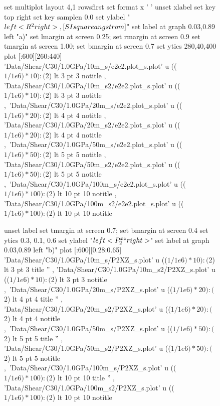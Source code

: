 \documentclass[aps,prb,reprint,superscriptaddress, a4paper]{revtex4-1}
\begin{document}
\begin{figure}
    	\begin{center}
		\begin{gnuplot}[terminal=pdf, terminaloptions={size \SERFigwidth cm, \SERFigheight cm color solid}]
			set multiplot layout 4,1 rowsfirst
			set format x ' '
			unset xlabel
			set key top right
			set key samplen  0.0
			set ylabel "$\\left< R^2\\right>  \\,[\\SI{}{\\square\\angstrom}]$"          
			set label at graph 0.03,0.89 left "a)"
			set lmargin at screen 0.25; set rmargin at screen 0.9
			set tmargin at screen 1.00; set bmargin at screen 0.7
			set ytics 280,40,400 
			plot [:600][260:440] 	'Data/Shear/C30/1.0GPa/10m_s/e2e2.plot_s.plot'  u  (($1/1e6)*10):($2) lt 3 pt 3 notitle  , 'Data/Shear/C30/1.0GPa/10m_s2/e2e2.plot_s.plot'  u (($1/1e6)*10):($2)  lt 3 pt 3 notitle ,\
								'Data/Shear/C30/1.0GPa/20m_s/e2e2.plot_s.plot'  u  (($1/1e6)*20):($2) lt 4 pt 4 notitle  , 'Data/Shear/C30/1.0GPa/20m_s2/e2e2.plot_s.plot'  u (($1/1e6)*20):($2)  lt 4 pt 4 notitle ,\
								'Data/Shear/C30/1.0GPa/50m_s/e2e2.plot_s.plot'   u (($1/1e6)*50):($2) lt 5 pt 5 notitle  , 'Data/Shear/C30/1.0GPa/50m_s2/e2e2.plot_s.plot' u  (($1/1e6)*50):($2)  lt 5 pt 5 notitle ,\
								'Data/Shear/C30/1.0GPa/100m_s/e2e2.plot_s.plot' u  (($1/1e6)*100):($2) lt 10 pt 10 notitle  , 'Data/Shear/C30/1.0GPa/100m_s2/e2e2.plot_s.plot' u (($1/1e6)*100):($2) lt 10 pt 10  notitle 
			
			unset label
			set tmargin at screen 0.7; set bmargin at screen 0.4
			set ytics 0.3, 0.1, 0.6			
			set ylabel "$\\left<P_{2}^{xz}\\right>$"        
			set label at graph 0.03,0.89 left "b)"  
			plot  [:600][0.28:0.65]	'Data/Shear/C30/1.0GPa/10m_s/P2XZ_s.plot' u   (($1/1e6)*10):($2) lt 3 pt 3 title '' , 'Data/Shear/C30/1.0GPa/10m_s2/P2XZ_s.plot' u   (($1/1e6)*10):($2) lt 3 pt 3 notitle  ,\
								'Data/Shear/C30/1.0GPa/20m_s/P2XZ_s.plot' u   (($1/1e6)*20):($2) lt 4 pt 4 title '' , 'Data/Shear/C30/1.0GPa/20m_s2/P2XZ_s.plot' u   (($1/1e6)*20):($2) lt 4 pt 4 notitle  ,\
								'Data/Shear/C30/1.0GPa/50m_s/P2XZ_s.plot' u  (($1/1e6)*50):($2)  lt 5 pt 5 title '' , 'Data/Shear/C30/1.0GPa/50m_s2/P2XZ_s.plot' u  (($1/1e6)*50):($2)  lt 5 pt 5 notitle ,\
								'Data/Shear/C30/1.0GPa/100m_s/P2XZ_s.plot' u  (($1/1e6)*100):($2) lt 10 pt 10 title '' , 'Data/Shear/C30/1.0GPa/100m_s2/P2XZ_s.plot' u (($1/1e6)*100):($2) lt 10 pt 10 notitle 


\end{gnuplot}
\end{center}
\end{figure}
\end{document}
